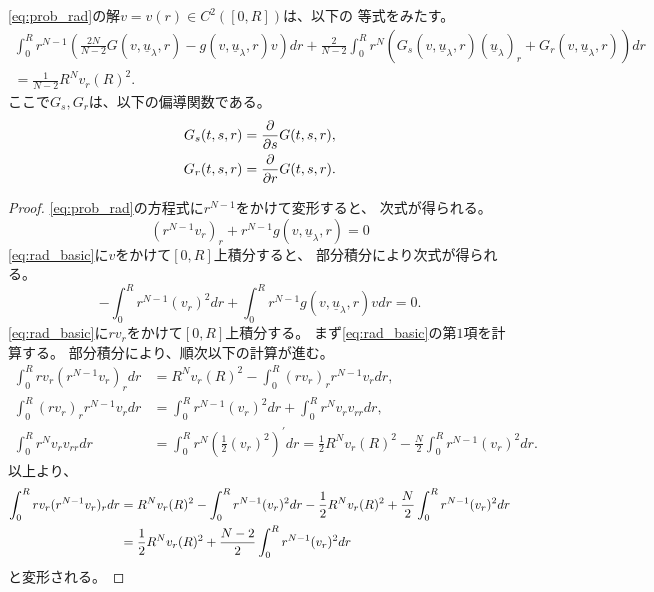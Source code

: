 \begin{lem}
 \eqref{eq:prob_rad}の解$v = v(r) \in C^2([0, R])$は、以下の
 等式をみたす。
 \begin{multline}
  \int_0^R r^{N-1} \left( \frac{2N}{N-2} G(v, \underline{u}_\lambda,
  r) - g(v, \underline{u}_\lambda, r) v \right) dr
  + \frac{2}{N-2} \int_0^R r^N \left( G_s(v, \underline{u}_\lambda, r)
  (\underline{u}_\lambda)_r + G_r(v, \underline{u}_\lambda, r)
  \right) dr \\ = \frac{1}{N-2} R^N v_r(R)^2. \label{eq:poh_eq}
 \end{multline}
 ここで$G_s, G_r$は、以下の偏導関数である。
 \begin{align*}
  G_s(t, s, r) &= \frac{\partial }{\partial s} G(t, s, r), \\
  G_r(t, s, r) &= \frac{\partial }{\partial r} G(t, s, r).
 \end{align*}
\end{lem}

\begin{proof}
 \eqref{eq:prob_rad}の方程式に$r^{N-1}$をかけて変形すると、
 次式が得られる。
 \begin{equation}
  (r^{N-1} v_r)_r + r^{N-1} g(v, \underline{u}_\lambda, r) = 0
   \label{eq:rad_basic} 
 \end{equation}
 \eqref{eq:rad_basic}に$v$をかけて$[0, R]$上積分すると、
 部分積分により次式が得られる。
 \begin{equation}
  - \int_0^R r^{N-1} (v_r)^2 dr + \int_0^R r^{N-1} g(v,
   \underline{u}_\lambda, r) v dr = 0.  \label{eq:poh_times_v}
 \end{equation}
 \eqref{eq:rad_basic}に$rv_r$をかけて$[0, R]$上積分する。
 まず\eqref{eq:rad_basic}の第$1$項を計算する。
 部分積分により、順次以下の計算が進む。
 \begin{align*}
  \int_0^R r v_r (r^{N-1} v_r)_r dr &= R^N v_r(R)^2 - \int_0^R
  (rv_r)_r r^{N-1} v_r dr, \\
  \int_0^R (rv_r)_r r^{N-1} v_r dr &= \int_0^R r^{N-1} (v_r)^2 dr +
  \int_0^R r^N v_r v_{rr} dr, \\
  \int_0^R r^N v_r v_{rr} dr &= \int_0^R r^N \left( \frac{1}{2}
  (v_r)^2 \right)^\prime dr = \frac{1}{2} R^N v_r(R)^2 - \frac{N}{2}
  \int_0^R r^{N-1} (v_r)^2 dr.
 \end{align*}
 以上より、
 \begin{align}
  \int_0^R r v_r (r^{N-1} v_r)_r dr &= R^N v_r(R)^2 - 
  \int_0^R r^{N-1} (v_r)^2 dr - \frac{1}{2} R^N v_r(R)^2 + \frac{N}{2}
  \int_0^R r^{N-1} (v_r)^2 dr \notag \\ 
  &= \frac{1}{2} R^N v_r(R)^2 + \frac{N-2}{2}\int_0^R r^{N-1} (v_r)^2
  dr \label{eq:poh_times_rvr_1}
 \end{align}
 と変形される。
\end{proof}


